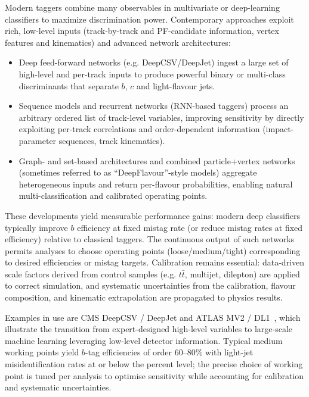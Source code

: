 Modern taggers combine many observables in multivariate or deep-learning classifiers to maximize discrimination power. Contemporary approaches exploit rich, low-level inputs (track-by-track and PF-candidate information, vertex features and kinematics) and advanced network architectures:

\begin{itemize}
  \item Deep feed-forward networks (e.g. DeepCSV/DeepJet) ingest a large set of high-level and per-track inputs to produce powerful binary or multi-class discriminants that separate $b$, $c$ and light-flavour jets.
  \item Sequence models and recurrent networks (RNN-based taggers) process an arbitrary ordered list of track-level variables, improving sensitivity by directly exploiting per-track correlations and order-dependent information (impact-parameter sequences, track kinematics).
  \item Graph- and set-based architectures and combined particle+vertex networks (sometimes referred to as ``DeepFlavour''-style models) aggregate heterogeneous inputs and return per-flavour probabilities, enabling natural multi-classification and calibrated operating points.
\end{itemize}

These developments yield measurable performance gains: modern deep classifiers typically improve $b$ efficiency at fixed mistag rate (or reduce mistag rates at fixed efficiency) relative to classical taggers. The continuous output of such networks permits analyses to choose operating points (loose/medium/tight) corresponding to desired efficiencies or mistag targets. Calibration remains essential: data-driven scale factors derived from control samples (e.g. $t\bar t$, multijet, dilepton) are applied to correct simulation, and systematic uncertainties from the calibration, flavour composition, and kinematic extrapolation are propagated to physics results.

Examples in use are CMS DeepCSV / DeepJet and ATLAS MV2 / DL1~\parencite{CMS_DeepTau,ATLAS:2022fgo}, which illustrate the transition from expert-designed high-level variables to large-scale machine learning leveraging low-level detector information. Typical medium working points yield $b$-tag efficiencies of order 60–80\% with light-jet misidentification rates at or below the percent level; the precise choice of working point is tuned per analysis to optimise sensitivity while accounting for calibration and systematic uncertainties.

